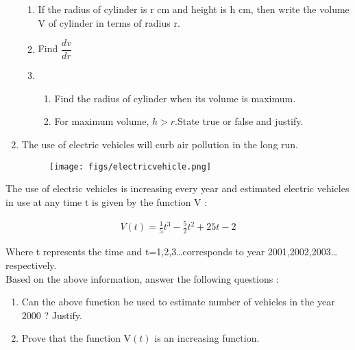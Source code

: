 \documentclass{article}
\providecommand{\brak}[1]{\ensuremath{\left(#1\right)}}
\begin{document}
\begin{enumerate}
 \begin{enumerate}[label=(\roman*)]

     \item  If the radius of cylinder is r cm and height is h cm, then write the volume V of cylinder in terms of radius r. 
     \item Find $\dfrac{dv}{dr}$ 
     
     \item 
	     \begin{enumerate}[label=(\alph*)]
     \item Find the radius of cylinder when its volume is maximum. 
   
     \item  For maximum volume, $h > r$.State true or false and justify. 
 \end{enumerate}
 \end{enumerate}
  \newpage  
 \item The use of electric vehicles will curb air pollution in the long run.
 
\begin{figure}[!h]
	\begin{center}
\texttt{[image: figs/electricvehicle.png]}
	\end{center}
\caption{}
\label{fig:electricvehicle}
\end{figure}
\end{enumerate}
  
 The use of electric vehicles is increasing every year and estimated electric vehicles in use at any time t is given by the function V :
 
 \begin{align}
    V\brak{t}=\frac{1}{5}t^3 - \frac{5}{2}t^2 + 25t-2 
 \end{align}


 Where t represents the time and t=1,2,3\dots corresponds to year 2001,2002,2003\dots respectively.\\
 Based on the above information, answer the following questions :
 \begin{enumerate}[label=(\roman*)]
     \item Can the above function be used to estimate number of vehicles in the year 2000 ? Justify. 
     \item Prove that the function V\brak{t} is an increasing function.
 \end{enumerate}
 
 
   
  
  
\end{document}
